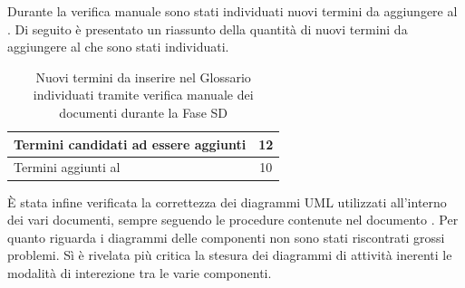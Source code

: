 				Durante la verifica manuale sono stati individuati nuovi termini da aggiungere al . Di seguito è presentato un 
				riassunto della quantità di nuovi termini da aggiungere al  che sono stati individuati.
				\begin{table}[H]
					\centering
					\begin{tabu}{| l | c |}
						\hline
						Termini candidati ad essere aggiunti	&	12\\ \hline
						Termini aggiunti al 	& 10\\ \hline
					\end{tabu}
					\caption{Nuovi termini da inserire nel Glossario individuati tramite verifica manuale dei documenti durante la Fase SD}
				\end{table}
				È stata infine verificata la correttezza dei diagrammi UML utilizzati all'interno dei vari documenti, sempre seguendo le procedure contenute nel documento . Per quanto riguarda i diagrammi delle componenti non sono stati riscontrati grossi problemi. Sì è rivelata più critica la stesura dei diagrammi di attività inerenti le modalità di interezione tra le varie componenti.
				
